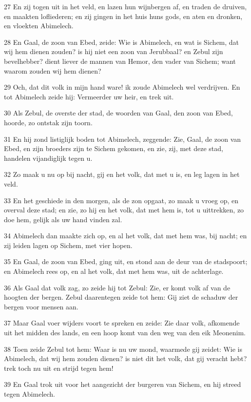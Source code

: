 \par 27 En zij togen uit in het veld, en lazen hun wijnbergen af, en traden de druiven, en maakten lofliederen; en zij gingen in het huis huns gods, en aten en dronken, en vloekten Abimelech.
\par 28 En Gaal, de zoon van Ebed, zeide: Wie is Abimelech, en wat is Sichem, dat wij hem dienen zouden? is hij niet een zoon van Jerubbaal? en Zebul zijn bevelhebber? dient liever de mannen van Hemor, den vader van Sichem; want waarom zouden wij hem dienen?
\par 29 Och, dat dit volk in mijn hand ware! ik zoude Abimelech wel verdrijven. En tot Abimelech zeide hij: Vermeerder uw heir, en trek uit.
\par 30 Als Zebul, de overste der stad, de woorden van Gaal, den zoon van Ebed, hoorde, zo ontstak zijn toorn.
\par 31 En hij zond listiglijk boden tot Abimelech, zeggende: Zie, Gaal, de zoon van Ebed, en zijn broeders zijn te Sichem gekomen, en zie, zij, met deze stad, handelen vijandiglijk tegen u.
\par 32 Zo maak u nu op bij nacht, gij en het volk, dat met u is, en leg lagen in het veld.
\par 33 En het geschiede in den morgen, als de zon opgaat, zo maak u vroeg op, en overval deze stad; en zie, zo hij en het volk, dat met hem is, tot u uittrekken, zo doe hem, gelijk als uw hand vinden zal.
\par 34 Abimelech dan maakte zich op, en al het volk, dat met hem was, bij nacht; en zij leiden lagen op Sichem, met vier hopen.
\par 35 En Gaal, de zoon van Ebed, ging uit, en stond aan de deur van de stadspoort; en Abimelech rees op, en al het volk, dat met hem was, uit de achterlage.
\par 36 Als Gaal dat volk zag, zo zeide hij tot Zebul: Zie, er komt volk af van de hoogten der bergen. Zebul daarentegen zeide tot hem: Gij ziet de schaduw der bergen voor mensen aan.
\par 37 Maar Gaal voer wijders voort te spreken en zeide: Zie daar volk, afkomende uit het midden des lands, en een hoop komt van den weg van den eik Meonenim.
\par 38 Toen zeide Zebul tot hem: Waar is nu uw mond, waarmede gij zeidet: Wie is Abimelech, dat wij hem zouden dienen? is niet dit het volk, dat gij veracht hebt? trek toch nu uit en strijd tegen hem!
\par 39 En Gaal trok uit voor het aangezicht der burgeren van Sichem, en hij streed tegen Abimelech.

